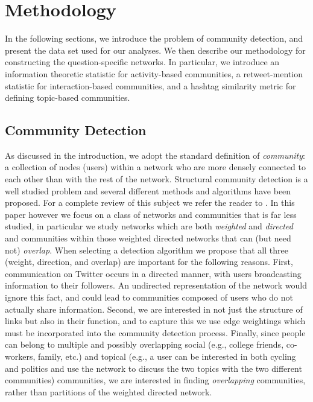\section{Methodology}

In the following sections, we introduce the problem of community detection, and present the data set used for our analyses. We then describe our methodology for constructing the question-specific networks. In particular, we introduce an information theoretic statistic for activity-based communities, a retweet-mention statistic for interaction-based communities, and a hashtag similarity metric for defining topic-based communities.

\subsection{Community Detection}

As discussed in the introduction, we adopt the standard definition of \emph{community}: a collection of nodes (users) within a network who are more densely connected to each other than with the rest of the network. Structural community detection is a well studied problem and several different methods and algorithms have been proposed. For a complete review of this subject we refer the reader to \cite{porter2009communities, fortunato2010community}. In this paper however we focus on a class of networks and communities that is far less studied, in particular we study networks which are both \textit{weighted} and \textit{directed} and communities within those weighted directed networks that can (but need not) \emph{overlap}. When selecting a detection algorithm we propose that all three (weight, direction, and overlap) are important for the following reasons. First, communication on Twitter occurs in a directed manner, with users broadcasting information to their followers. An undirected representation of the network would ignore this fact, and could lead to communities composed of users who do not actually share information. Second, we are interested in not just the structure of links but also in their function, and to capture this we use edge weightings which must be incorporated into the community detection process. Finally, since people can belong to multiple and possibly overlapping social (e.g., college friends, co-workers, family, etc.) and topical (e.g., a user can be interested in both cycling and politics and use the network to discuss the two topics with the two different communities) communities, we are interested in finding \textit{overlapping} communities, rather than partitions of the weighted directed network. 

